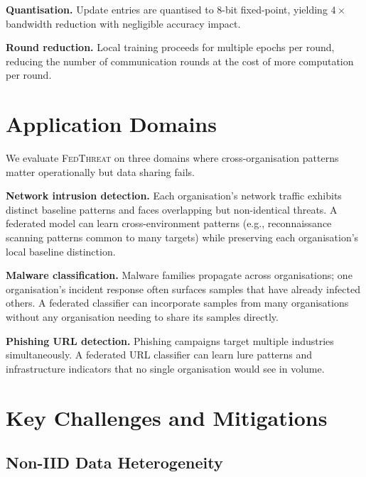 \documentclass[sigconf,nonacm]{acmart}
\begin{document}
\textbf{Quantisation.} Update entries are quantised to 8-bit fixed-point,
yielding $4\times$ bandwidth reduction with negligible accuracy impact.

\textbf{Round reduction.} Local training proceeds for multiple epochs per
round, reducing the number of communication rounds at the cost of more
computation per round.

\section{Application Domains}

We evaluate \textsc{FedThreat} on three domains where cross-organisation
patterns matter operationally but data sharing fails.

\textbf{Network intrusion detection.} Each organisation's network traffic
exhibits distinct baseline patterns and faces overlapping but non-identical
threats. A federated model can learn cross-environment patterns
(e.g., reconnaissance scanning patterns common to many targets) while
preserving each organisation's local baseline distinction.

\textbf{Malware classification.} Malware families propagate across
organisations; one organisation's incident response often surfaces samples
that have already infected others. A federated classifier can incorporate
samples from many organisations without any organisation needing to share
its samples directly.

\textbf{Phishing URL detection.} Phishing campaigns target multiple
industries simultaneously. A federated URL classifier can learn lure
patterns and infrastructure indicators that no single organisation would
see in volume.

\section{Key Challenges and Mitigations}

\subsection{Non-IID Data Heterogeneity}
\end{document}
